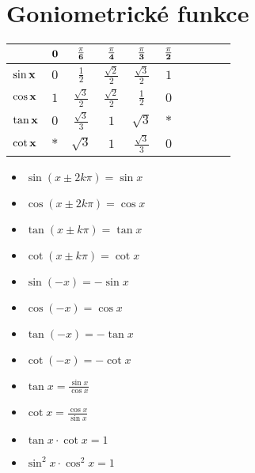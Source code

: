 \documentclass[main.tex]{subfiles}
\begin{document}
\section*{Goniometrické funkce}
\begin{multicols}{4}
  \begingroup
    \centering
    \renewcommand{\arraystretch}{1.55}
    \begin{tabular}{p{1.5em}|ccccccccc}
                      &	$\mathbf{0}$	&	$\mathbf{\frac{\pi}{6}}$	&	$\mathbf{\frac{\pi}{4}}$	&	$\mathbf{\frac{\pi}{3}}$	&	$\mathbf{\frac{\pi}{2}}$	\\\hline
      $\mathbf{\sin{x}}$	&	$0$				&	$\frac{1}{2}$					&	$\frac{\sqrt{2}}{2}$	&	$\frac{\sqrt{3}}{2}$	&	$1$										\\
      $\mathbf{\cos{x}}$	&	$1$				&	$\frac{\sqrt{3}}{2}$	&	$\frac{\sqrt{2}}{2}$	&	$\frac{1}{2}$					&	$0$										\\
      $\mathbf{\tan{x}}$	&	$0$				&	$\frac{\sqrt{3}}{3}$	&	$1$										&	$\sqrt{3}$						&	$*$										\\
      $\mathbf{\cot{x}}$	&	$*$				&	$\sqrt{3}$						&	$1$										&	$\frac{\sqrt{3}}{3}$	&	$0$										\\
    \end{tabular}
  \endgroup
  \columnbreak
  \begin{itemize}
  \begingroup
    \item $\sin{(x \pm 2k\pi)} = \sin{x}$
    \item $\cos{(x \pm 2k\pi)} = \cos{x}$
    \item $\tan{(x \pm k\pi)} = \tan{x}$
    \item $\cot{(x \pm k\pi)} = \cot{x}$
  \columnbreak
    \item $\sin{(-x)} = -\sin{x}$
    \item $\cos{(-x)} = \cos{x}$
    \item $\tan{(-x)} = -\tan{x}$
    \item $\cot{(-x)} = -\cot{x}$
  \columnbreak
    \item $\tan{x} = \frac{\sin{x}}{\cos{x}}$
    \item $\cot{x} = \frac{\cos{x}}{\sin{x}}$
    \item $\tan{x} \cdot \cot{x} = 1$
    \item $\sin^{2}{x} \cdot \cos^{2}{x} = 1$
  \endgroup
  \end{itemize}
\end{multicols}
\end{document}

